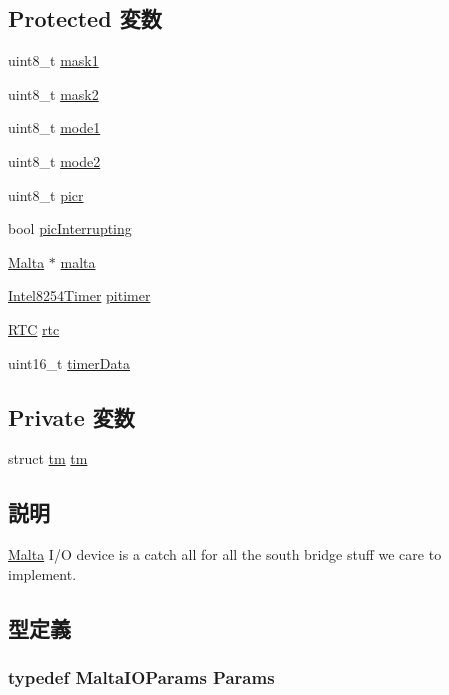 \subsection*{Protected 変数}
\begin{DoxyCompactItemize}
\item 
uint8\_\-t \hyperlink{classMaltaIO_adaf4809f6b77e7cde58780f5f451a6e4}{mask1}
\item 
uint8\_\-t \hyperlink{classMaltaIO_a474e49c245ff8b6dc57653a9cd7f64dc}{mask2}
\item 
uint8\_\-t \hyperlink{classMaltaIO_a9237c26b42f96e5e4ad44839abdf85ce}{mode1}
\item 
uint8\_\-t \hyperlink{classMaltaIO_af51e3a81fa6352c9fbc24d5bc03d843f}{mode2}
\item 
uint8\_\-t \hyperlink{classMaltaIO_a8472e2cd6c519d77f7b7ab878a42fa40}{picr}
\item 
bool \hyperlink{classMaltaIO_ab72d9ca48cf8b7b897799490833c4b5e}{picInterrupting}
\item 
\hyperlink{classMalta}{Malta} $\ast$ \hyperlink{classMaltaIO_ae7ba1afe6be03355de9c5cbc41c11f96}{malta}
\item 
\hyperlink{classIntel8254Timer}{Intel8254Timer} \hyperlink{classMaltaIO_a0447f4b0ded66f26d3ce882c29d1125e}{pitimer}
\item 
\hyperlink{classMaltaIO_1_1RTC}{RTC} \hyperlink{classMaltaIO_afa7e240c7456eaf5ef27ee8be3a23bd4}{rtc}
\item 
uint16\_\-t \hyperlink{classMaltaIO_ac2f6e48e9ea7cdd01d0d4855725107d6}{timerData}
\end{DoxyCompactItemize}
\subsection*{Private 変数}
\begin{DoxyCompactItemize}
\item 
struct \hyperlink{classMaltaIO_a2182a1f5ef743c17d71096c490feb801}{tm} \hyperlink{classMaltaIO_a2182a1f5ef743c17d71096c490feb801}{tm}
\end{DoxyCompactItemize}


\subsection{説明}
\hyperlink{classMalta}{Malta} I/O device is a catch all for all the south bridge stuff we care to implement. 

\subsection{型定義}
\hypertarget{classMaltaIO_a67250d5117f4f6705cea74a7a228ccf0}{
\subsubsection[{Params}]{\setlength{\rightskip}{0pt plus 5cm}typedef MaltaIOParams {\bf Params}}}
\label{classMaltaIO_a67250d5117f4f6705cea74a7a228ccf0}


